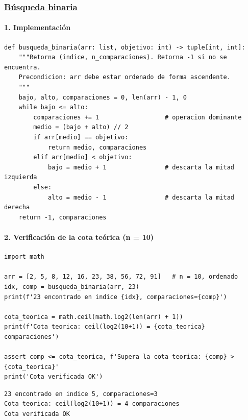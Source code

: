 \documentclass[12pt,a4paper]{article}
\begin{document}
\subsubsection*{\underline{Búsqueda binaria}}

\paragraph{1. Implementación}\mbox{}

\begin{lstlisting}[style=python,caption={\texttt{busqueda\_binaria(arr, objetivo)} retorna \texttt{(indice, comparaciones)}.}]
def busqueda_binaria(arr: list, objetivo: int) -> tuple[int, int]:
    """Retorna (indice, n_comparaciones). Retorna -1 si no se encuentra.
    Precondicion: arr debe estar ordenado de forma ascendente.
    """
    bajo, alto, comparaciones = 0, len(arr) - 1, 0
    while bajo <= alto:
        comparaciones += 1                  # operacion dominante
        medio = (bajo + alto) // 2
        if arr[medio] == objetivo:
            return medio, comparaciones
        elif arr[medio] < objetivo:
            bajo = medio + 1                # descarta la mitad izquierda
        else:
            alto = medio - 1                # descarta la mitad derecha
    return -1, comparaciones
\end{lstlisting}

\paragraph{2. Verificación de la cota teórica (n = 10)}\mbox{}

\begin{lstlisting}[style=python,caption={Prueba sobre el arreglo de 10 elementos del sílabo.}]
import math

arr = [2, 5, 8, 12, 16, 23, 38, 56, 72, 91]   # n = 10, ordenado
idx, comp = busqueda_binaria(arr, 23)
print(f'23 encontrado en indice {idx}, comparaciones={comp}')

cota_teorica = math.ceil(math.log2(len(arr) + 1))
print(f'Cota teorica: ceil(log2(10+1)) = {cota_teorica} comparaciones')

assert comp <= cota_teorica, f'Supera la cota teorica: {comp} > {cota_teorica}'
print('Cota verificada OK')
\end{lstlisting}

\begin{lstlisting}[style=consola,caption={Salida de consola.}]
23 encontrado en indice 5, comparaciones=3
Cota teorica: ceil(log2(10+1)) = 4 comparaciones
Cota verificada OK
\end{lstlisting}
\end{document}
